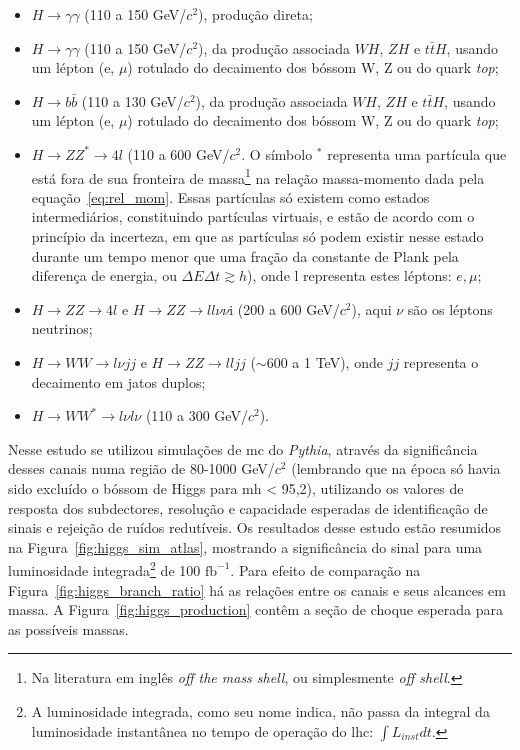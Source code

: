 \begin{itemize}
\item $H\rightarrow\gamma\gamma$ (110 a 150 GeV/$c^2$), produção direta;
\item $H\rightarrow\gamma\gamma$ (110 a 150 GeV/$c^2$), da produção associada $WH$, $ZH$ e
$t\bar{t}H$, usando um lépton (e, $\mu$) rotulado do decaimento dos bóssom W, Z ou
do quark \emph{top};
\item $H\rightarrow b\bar{b}$ (110 a 130 GeV/$c^2$), da produção associada $WH$, $ZH$ e
$t\bar{t}H$, usando um lépton (e, $\mu$) rotulado do decaimento dos bóssom W, Z ou
do quark \emph{top};
\item $H\rightarrow ZZ^*\rightarrow4l$ (110 a 600 GeV/$c^2$. O símbolo $^*$ representa uma partícula 
que está fora de sua fronteira de massa\footnote {Na literatura em inglês 
\emph{off the mass shell}, ou simplesmente \emph{off
shell}.} na relação massa-momento dada pela equação~\ref{eq:rel_mom}. Essas
partículas só existem como estados intermediários, constituindo partículas
virtuais, e estão de acordo com o princípio da incerteza, em que as partículas
só podem existir nesse estado durante um tempo menor que uma fração da
constante 
de Plank pela diferença de energia, ou $\Delta E \Delta t \gtrsim h$), onde l
representa estes léptons: $e,\mu$; 
\item $H\rightarrow ZZ\rightarrow4l$ e $H\rightarrow ZZ\rightarrow ll\nu\nu$i
(200 a 600 GeV/$c^2$), aqui $\nu$ são os léptons neutrinos;
\item $H\rightarrow WW\rightarrow l\nu jj$ e $H\rightarrow ZZ\rightarrow ll jj$
($\sim$600 a 1 TeV),
onde $jj$ representa o decaimento em jatos duplos;
\item $H\rightarrow WW^*\rightarrow l\nu l\nu$ (110 a 300 GeV/$c^2$). 
\end{itemize}


Nesse estudo se utilizou simulações
de \gls{mc} do \emph{Pythia}, através da significância desses 
canais numa região de 80-1000 GeV/$c^2$ (lembrando que na época só havia sido excluído
o bóssom de Higgs para \gls{mh} < 95,2), utilizando os valores de resposta dos
subdectores, resolução e capacidade esperadas de identificação de sinais e rejeição 
de ruídos redutíveis. 
Os resultados desse estudo estão resumidos na Figura~\ref{fig:higgs_sim_atlas},
mostrando a significância do sinal para uma luminosidade integrada\footnote{A 
luminosidade integrada, como seu nome indica, não passa da integral da luminosidade 
instantânea no tempo de operação do \gls{lhc}: $\int{L_{inst} dt}$.} de
100 $\text{fb}^{-1}$. Para efeito de comparação na
Figura~\ref{fig:higgs_branch_ratio} há as relações entre os canais
e seus alcances em massa. A Figura~\ref{fig:higgs_production} contêm a seção
de choque esperada para as possíveis massas.

